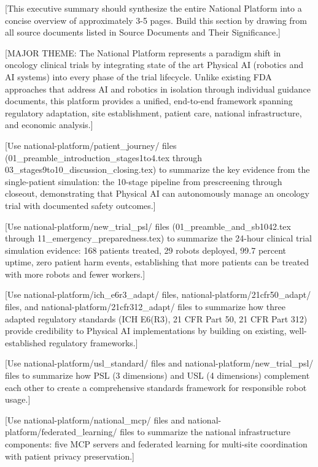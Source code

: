 \thispagestyle{acknowledgements}

[This executive summary should synthesize the entire National Platform into a
concise overview of approximately 3-5 pages. Build this section by drawing from
all source documents listed in Source Documents and Their Significance.]

[MAJOR THEME: The National Platform represents a paradigm shift in oncology
clinical trials by integrating state of the art Physical AI (robotics and
AI systems) into every phase of the trial lifecycle. Unlike existing FDA
approaches that address AI and robotics in isolation through individual guidance
documents, this platform provides a unified, end-to-end framework spanning
regulatory adaptation, site establishment, patient care, national
infrastructure, and economic analysis.]

[Use national-platform/patient\_journey/ files
(01\_preamble\_introduction\_stages1to4.tex through
03\_stages9to10\_discussion\_closing.tex) to summarize the key evidence from the
single-patient simulation: the 10-stage pipeline from prescreening through
closeout, demonstrating that Physical AI can autonomously manage an oncology
trial with documented safety outcomes.]

[Use national-platform/new\_trial\_psl/ files (01\_preamble\_and\_sb1042.tex
through 11\_emergency\_preparedness.tex) to summarize the 24-hour clinical trial
simulation evidence: 168 patients treated, 29 robots deployed, 99.7 percent
uptime, zero patient harm events, establishing that more patients can be treated
with more robots and fewer workers.]

[Use national-platform/ich\_e6r3\_adapt/ files, national-platform/21cfr50\_adapt/
files, and national-platform/21cfr312\_adapt/ files to summarize how three
adapted regulatory standards (ICH E6(R3), 21 CFR Part 50, 21 CFR Part 312)
provide credibility to Physical AI implementations by building on existing,
well-established regulatory frameworks.]

[Use national-platform/usl\_standard/ files and national-platform/new\_trial\_psl/
files to summarize how PSL (3 dimensions) and USL (4 dimensions) complement each
other to create a comprehensive standards framework for responsible robot usage.]

[Use national-platform/national\_mcp/ files and national-platform/federated\_learning/
files to summarize the national infrastructure components: five MCP servers and
federated learning for multi-site coordination with patient privacy preservation.]

